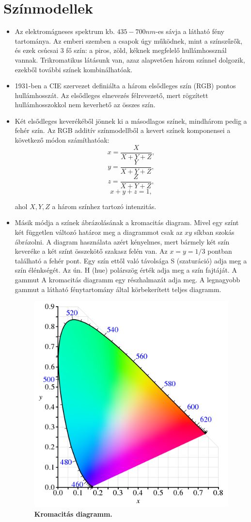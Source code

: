 \documentclass[12pt]{article}
\theoremstyle{plain}
\begin{document}
\section{Színmodellek}
\begin{itemize}
    \item Az elektromágneses spektrum kb. $435 - 700 nm$-es sávja a látható fény tartománya. Az emberi szemben a csapok úgy működnek, mint a színszűrők, és ezek csúcsai 3 fő szín: a piros, zöld, kéknek megfelelő hullámhossznál vannak. Trikromatikus látásunk van, azaz alapvetően három színnel dolgozik, ezekből további színek kombinálhatóak.
    \item 1931-ben a CIE szervezet definiálta a három elsődleges szín (RGB) pontos hullámhosszát. Az elsődleges elnevezés félrevezető, mert rögzített hullámhosszokkol nem keverhető az összes szín.
    \item Két elsődleges keverékéből jönnek ki a másodlagos színek, mindhárom pedig a fehér szín. Az RGB additív színmodellből a kevert színek komponensei a következő módon számíthatóak:
    $$x = \frac{X}{X+Y+Z},$$
    $$y = \frac{Y}{X+Y+Z},$$
    $$z = \frac{Z}{X+Y+Z},$$
    $$x+y+z = 1,$$
    
    ahol $X,Y,Z$ a három színhez tartozó intenzitás.
    
    \item Másik módja a színek ábrázolásának a kromacitás diagram. Mivel egy színt két független változó határoz meg a diagrammot csak az $xy$ síkban szokás ábrázolni. A diagram használata azért kényelmes, mert bármely két szín keveréke a két színt összekötő szakasz felén van. Az $x=y=1/3$ pontban található a fehér pont. Egy szín ettől való távolsága S (szaturáció) adja meg a szín élénkségét. Az ún. H (hue) polárszög érték adja meg a szín fajtáját.  A gammut A kromacitás diagramm egy részhalmazát adja meg. A legnagyobb gammut a látható fénytartomány által körbekerített teljes diagramm.
    
    
    \begin{figure}[H]
    \begin{center}
    \includegraphics[width=0.55\linewidth]{media/chro.png}
    \caption{\textbf{Kromacitás diagramm.}} 
    \label{fig:chro}
    \end{center}
\end{figure}
    

\end{itemize}
\end{document}
